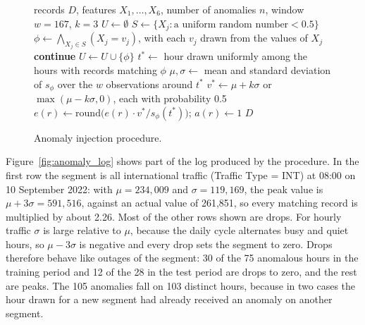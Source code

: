 \begin{figure}[H]
    \centering
    \begin{minipage}{0.92\textwidth}
    \begin{algorithmic}[1]
        \Require records $D$, features $X_1,\dots,X_6$, number of anomalies $n$, window $w = 167$, $k = 3$
        \State $U \gets \emptyset$ 
            \State $S \gets \{X_j : \text{a uniform random number} < 0.5\}$
            \State $\phi \gets \bigwedge_{X_j \in S} (X_j = v_j)$, with each $v_j$ drawn from the values of $X_j$
             \textbf{continue} \EndIf
            \State $U \gets U \cup \{\phi\}$
            \State $t^{*} \gets$ hour drawn uniformly among the hours with records matching $\phi$
            \State $\mu, \sigma \gets$ mean and standard deviation of $s_\phi$ over the $w$ observations around $t^{*}$
            \State $v^{*} \gets \mu + k\sigma$ or $\max(\mu - k\sigma, 0)$, each with probability 0.5
                \State $e(r) \gets \mathrm{round}\big(e(r) \cdot v^{*} / s_\phi(t^{*})\big)$; \quad $a(r) \gets 1$
            \EndFor
        \EndWhile
        \State \Return $D$
    \end{algorithmic}
    \end{minipage}
    \caption[Anomaly injection procedure]{Anomaly injection procedure.}
    \label{alg:injection}
\end{figure}

Figure~\ref{fig:anomaly_log} shows part of the log produced by the procedure.
In the first row the segment is all international traffic (Traffic Type = INT) at 08:00 on 10 September 2022: with $\mu = 234{,}009$ and $\sigma = 119{,}169$, the peak value is $\mu + 3\sigma = 591{,}516$, against an actual value of 261{,}851, so every matching record is multiplied by about 2.26.
Most of the other rows shown are drops.
For hourly traffic $\sigma$ is large relative to $\mu$, because the daily cycle alternates busy and quiet hours, so $\mu - 3\sigma$ is negative and every drop sets the segment to zero.
Drops therefore behave like outages of the segment: 30 of the 75 anomalous hours in the training period and 12 of the 28 in the test period are drops to zero, and the rest are peaks.
The 105 anomalies fall on 103 distinct hours, because in two cases the hour drawn for a new segment had already received an anomaly on another segment.

